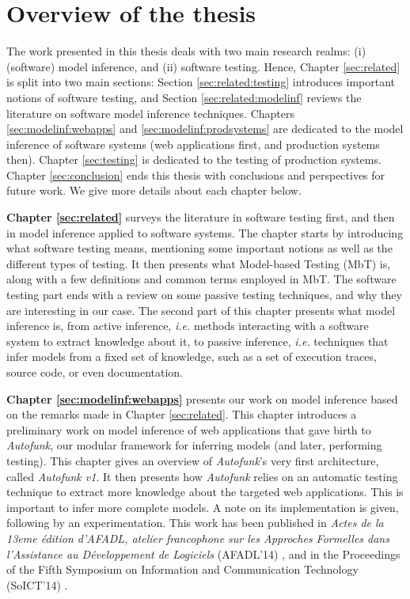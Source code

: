 
\section{Overview of the thesis}
\label{sec:intro:overview}

The work presented in this thesis deals with two main research
realms: (i) (software) model inference, and (ii) software
testing. Hence, Chapter \ref{sec:related} is split into two main
sections: Section \ref{sec:related:testing} introduces important
notions of software testing, and Section
\ref{sec:related:modelinf} reviews the literature on software
model inference techniques. Chapters \ref{sec:modelinf:webapps}
and \ref{sec:modelinf:prodsystems} are dedicated to the model
inference of software systems (web applications first, and
production systems then). Chapter \ref{sec:testing} is dedicated
to the testing of production systems. Chapter
\ref{sec:conclusion} ends this thesis with conclusions and
perspectives for future work. We give more details about each
chapter below.

\textbf{Chapter \ref{sec:related}} surveys the literature in
software testing first, and then in model inference applied to
software systems. The chapter starts by introducing what software
testing means, mentioning some important notions as well as the
different types of testing. It then presents what Model-based
Testing (MbT) is, along with a few definitions and common terms
employed in MbT. The software testing part ends with a review on
some passive testing techniques, and why they are interesting in
our case. The second part of this chapter presents what model
inference is, from active inference, \emph{i.e.} methods
interacting with a software system to extract knowledge about it,
to passive inference, \emph{i.e.} techniques that infer models
from a fixed set of knowledge, such as a set of execution traces,
source code, or even documentation.

\textbf{Chapter \ref{sec:modelinf:webapps}} presents our work on
model inference based on the remarks made in Chapter
\ref{sec:related}. This chapter introduces a preliminary work on
model inference of web applications that gave birth to
\textit{Autofunk}, our modular framework for inferring models
(and later, performing testing). This chapter gives an overview
of \textit{Autofunk}'s very first architecture, called
\emph{Autofunk v1}. It then presents how \emph{Autofunk} relies
on an automatic testing technique to extract more knowledge about
the targeted web applications. This is important to infer more
complete models.  A note on its implementation is
given, following by an experimentation. This work has been
published in \emph{Actes de la 13eme {\'e}dition d’AFADL, atelier
francophone sur les Approches Formelles dans l’Assistance au
D{\'e}veloppement de Logiciels} (AFADL'14)
\cite{durand2014inference}, and in the Proceedings of the Fifth
Symposium on Information and Communication Technology (SoICT'14)
\cite{DBLP:conf/soict/DurandS14}.

